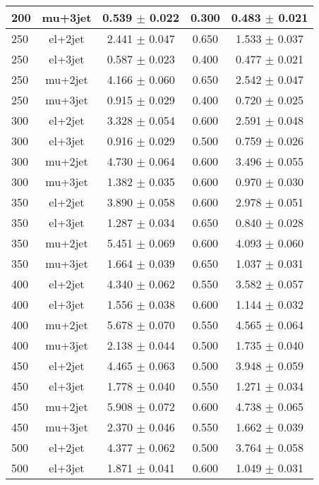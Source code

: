 \begin{table}
\begin{center}
{\begin{tabular}{l|c|c|c|c}
200 & mu+3jet  &   0.539 $\pm$ 0.022   &  0.300   &   0.483 $\pm$ 0.021  \\
\hline
250 & el+2jet  &   2.441 $\pm$ 0.047   &  0.650   &   1.533 $\pm$ 0.037  \\
250 & el+3jet  &   0.587 $\pm$ 0.023   &  0.400   &   0.477 $\pm$ 0.021  \\
250 & mu+2jet  &   4.166 $\pm$ 0.060   &  0.650   &   2.542 $\pm$ 0.047  \\
250 & mu+3jet  &   0.915 $\pm$ 0.029   &  0.400   &   0.720 $\pm$ 0.025  \\
\hline
300 & el+2jet  &   3.328 $\pm$ 0.054   &  0.600   &   2.591 $\pm$ 0.048  \\
300 & el+3jet  &   0.916 $\pm$ 0.029   &  0.500   &   0.759 $\pm$ 0.026  \\
300 & mu+2jet  &   4.730 $\pm$ 0.064   &  0.600   &   3.496 $\pm$ 0.055  \\
300 & mu+3jet  &   1.382 $\pm$ 0.035   &  0.600   &   0.970 $\pm$ 0.030  \\
\hline
350 & el+2jet  &   3.890 $\pm$ 0.058   &  0.600   &   2.978 $\pm$ 0.051  \\
350 & el+3jet  &   1.287 $\pm$ 0.034   &  0.650   &   0.840 $\pm$ 0.028  \\
350 & mu+2jet  &   5.451 $\pm$ 0.069   &  0.600   &   4.093 $\pm$ 0.060  \\
350 & mu+3jet  &   1.664 $\pm$ 0.039   &  0.650   &   1.037 $\pm$ 0.031  \\
\hline
400 & el+2jet  &   4.340 $\pm$ 0.062   &  0.550   &   3.582 $\pm$ 0.057  \\
400 & el+3jet  &   1.556 $\pm$ 0.038   &  0.600   &   1.144 $\pm$ 0.032  \\
400 & mu+2jet  &   5.678 $\pm$ 0.070   &  0.550   &   4.565 $\pm$ 0.064  \\
400 & mu+3jet  &   2.138 $\pm$ 0.044   &  0.500   &   1.735 $\pm$ 0.040  \\
\hline
450 & el+2jet  &   4.465 $\pm$ 0.063   &  0.500   &   3.948 $\pm$ 0.059  \\
450 & el+3jet  &   1.778 $\pm$ 0.040   &  0.550   &   1.271 $\pm$ 0.034  \\
450 & mu+2jet  &   5.908 $\pm$ 0.072   &  0.600   &   4.738 $\pm$ 0.065  \\
450 & mu+3jet  &   2.370 $\pm$ 0.046   &  0.550   &   1.662 $\pm$ 0.039  \\
\hline
500 & el+2jet  &   4.377 $\pm$ 0.062   &  0.500   &   3.764 $\pm$ 0.058  \\
500 & el+3jet  &   1.871 $\pm$ 0.041   &  0.600   &   1.049 $\pm$ 0.031  \\

\end{tabular}}
\end{center}
\end{table}
